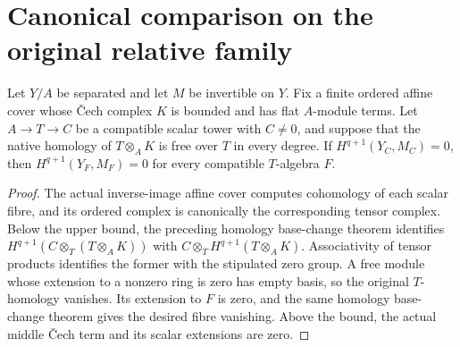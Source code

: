 \chapter{Canonical comparison on the original relative family}

\begin{theorem}
\label{thm:relative-native-fibre-free-specialization}
\leanok
Let $Y/A$ be separated and let $M$ be invertible on $Y$. Fix a finite
ordered affine cover whose Čech complex $K$ is bounded and has flat
$A$-module terms. Let $A\to T\to C$ be a compatible scalar tower with
$C\ne0$, and suppose that the native homology of $T\otimes_A K$ is
free over $T$ in every degree. If $H^{q+1}(Y_C,M_C)=0$, then
$H^{q+1}(Y_F,M_F)=0$ for every compatible $T$-algebra $F$.
\end{theorem}
\begin{proof}
The actual inverse-image affine cover computes cohomology of each scalar
fibre, and its ordered complex is canonically the corresponding tensor
complex. Below the upper bound, the preceding homology base-change theorem
identifies $H^{q+1}(C\otimes_T(T\otimes_A K))$ with
$C\otimes_T H^{q+1}(T\otimes_A K)$. Associativity of tensor products
identifies the former with the stipulated zero group. A free module whose
extension to a nonzero ring is zero has empty basis, so the original
$T$-homology vanishes. Its extension to $F$ is zero, and the same homology
base-change theorem gives the desired fibre vanishing. Above the bound,
the actual middle Čech term and its scalar extensions are zero.
\end{proof}

